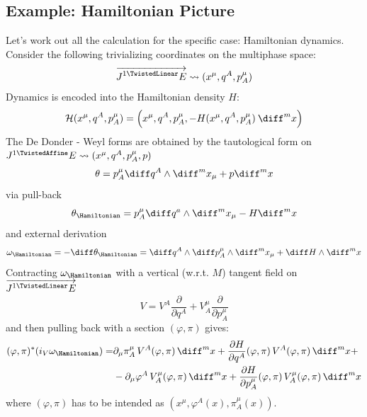 \documentclass[a4paper,12pt,fleqn]{scrartcl}  %
\renewcommand{\AffDualJet}{ J^{1 \TwistedAffine}E }
\renewcommand{\LinDualJet}{ \overrightarrow{J^{1 \TwistedLinear}E} }
\begin{document}
\subsection{Example: Hamiltonian Picture}
Let's work out all the calculation for the specific case: Hamiltonian dynamics.\\
Consider the following trivializing coordinates on the multiphase space:
\begin{displaymath}
	\LinDualJet \rightsquigarrow (x^\mu, q^A, p^\mu_A)
\end{displaymath}
%
Dynamics is encoded into the Hamiltonian density $H$:
\begin{displaymath}
	\mathcal{H}(x^\mu, q^A, p^\mu_A) = 
	\left(x^\mu, q^A, p^\mu_A, - H( x^\mu, q^A, p^\mu_A) \: \diff^m x \right)
\end{displaymath}
%
The De Donder - Weyl forms are obtained by the tautological form on $\AffDualJet \rightsquigarrow (x^\mu, q^A, p^\mu_A, p)$
\begin{displaymath}
	\theta = p^\mu_A \diff q^A \wedge \diff^m x_\mu + p \diff^m x
\end{displaymath}
via pull-back
\begin{displaymath}
	\theta_\Hamiltonian = p^\mu_A \diff q^a \wedge \diff^m x_\mu - H \diff^m x
\end{displaymath}
and external derivation
\begin{displaymath}
	\omega_\Hamiltonian = -\diff \theta_\Hamiltonian = \diff q^A \wedge \diff p^\mu_A \wedge \diff^m x_\mu + \diff H \wedge \diff^m x 
\end{displaymath}
%
Contracting $\omega_\Hamiltonian$ with a vertical (w.r.t. $M$) tangent field on $\LinDualJet$
\begin{displaymath}
	V = V^A \dfrac{\partial}{\partial q^A} +
			V^\mu_A \dfrac{\partial}{\partial p^\mu_A}
\end{displaymath}
and then pulling back with a section $(\varphi,\pi)$ gives:
\begin{align*}
	(\varphi , \pi)^\ast (i_V \omega_\Hamiltonian ) = & 
	\partial_\mu \pi^\mu_A \, V^A(\varphi,\pi) \, \diff^m x 
	+ \frac{\partial H}{\partial q^A} (\varphi,\pi) \, V^A(\varphi,\pi) \, \diff^m x + \\
	 & - \partial_\mu \varphi^A \, V^\mu_A(\varphi,\pi) \, \diff^m x +
	\frac{\partial H}{\partial p^\mu_A} (\varphi,\pi) \, V^\mu_A(\varphi,\pi) \, \diff^m x
\end{align*}
where $(\varphi, \pi)$ has to be intended as $\left(x^\mu, \varphi^A(x), \pi^\mu_A(x)\right)$.
\end{document}
